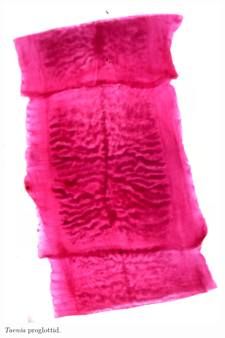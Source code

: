 \begin{figure}

{\centering \includegraphics[width=0.7\linewidth]{./figures/rotifera/taenia_proglottids}

}

\caption{\emph{Taenia} proglottid.}\label{fig:proglottid}
\end{figure}

